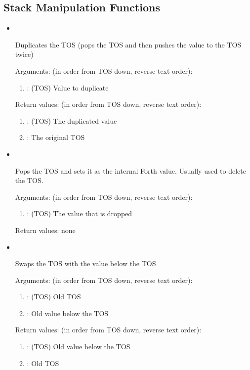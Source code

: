 \subsection{Stack Manipulation Functions}
\begin{itemize}

\item {}\ 

\noindent Duplicates the TOS (pops the TOS and then pushes the value to the TOS twice)

\noindent Arguments: (in order from TOS down, reverse text order):
\begin{enumerate}
\item {}: (TOS) Value to duplicate
\end{enumerate}

\noindent Return values: (in order from TOS down, reverse text order):
\begin{enumerate}
\item {}: (TOS) The duplicated value
\item {}: The original TOS
\end{enumerate}

\item {}\ 

\noindent Pops the TOS and sets it as the internal Forth  value. Usually used to delete the TOS.

\noindent Arguments: (in order from TOS down, reverse text order):
\begin{enumerate}
\item {}: (TOS) The value that is dropped
\end{enumerate}

\noindent Return values: none

\item {}\ 

\noindent Swaps the TOS with the value below the TOS

\noindent Arguments: (in order from TOS down, reverse text order):
\begin{enumerate}
\item {}: (TOS) Old TOS
\item {}: Old value below the TOS
\end{enumerate}

\noindent Return values: (in order from TOS down, reverse text order):
\begin{enumerate}
\item {}: (TOS) Old value below the TOS
\item {}: Old TOS
\end{enumerate}


\end{itemize}
